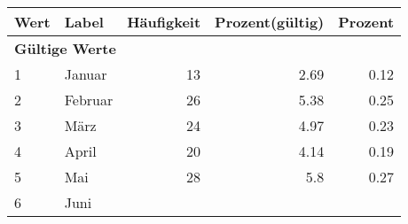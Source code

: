      \begin{longtable}{lXrrr}
     \toprule
     \textbf{Wert} & \textbf{Label} & \textbf{Häufigkeit} & \textbf{Prozent(gültig)} & \textbf{Prozent} \\
     \endhead
     \midrule
     \multicolumn{5}{l}{\textbf{Gültige Werte}}\\

     1 &
     \multicolumn{1}{X}{ Januar   } &


       \num{13} &
       \num[round-mode=places,round-precision=2]{2,69} &
         \num[round-mode=places,round-precision=2]{0,12} \\

     2 &
     \multicolumn{1}{X}{ Februar   } &


       \num{26} &
       \num[round-mode=places,round-precision=2]{5,38} &
         \num[round-mode=places,round-precision=2]{0,25} \\

     3 &
     \multicolumn{1}{X}{ März   } &


       \num{24} &
       \num[round-mode=places,round-precision=2]{4,97} &
         \num[round-mode=places,round-precision=2]{0,23} \\

     4 &
     \multicolumn{1}{X}{ April   } &


       \num{20} &
       \num[round-mode=places,round-precision=2]{4,14} &
         \num[round-mode=places,round-precision=2]{0,19} \\

     5 &
     \multicolumn{1}{X}{ Mai   } &


       \num{28} &
       \num[round-mode=places,round-precision=2]{5,8} &
         \num[round-mode=places,round-precision=2]{0,27} \\

     6 &
     \multicolumn{1}{X}{ Juni   } &



\end{longtable}
